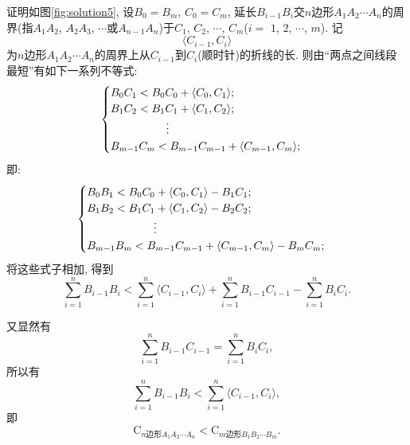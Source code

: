 \documentclass{article}
\begin{document}
{\heiti 证明}\quad 如图\ref{fig:solution5}, 设$B_0=B_m$, $C_0=C_m$, 延长$B_{i-1}B_i$交$n\text{边形}A_1A_2\cdots A_n$的周界(指$A_1A_2$, $A_2A_3$, $\cdots$或$A_{n-1}A_n$)于$C_1$, $C_2$, $\cdots$, $C_m$($i=$ $1$, $2$, $\cdots$, $m$). 记
\[\langle C_{i-1}, C_i\rangle\]
为$n\text{边形}A_1A_2\cdots A_n$的周界上从$C_{i-1}$到$C_i$(顺时针)的折线的长. 则由“两点之间线段最短”有如下一系列不等式:
\[\begin{cases}
	B_0C_1<B_0C_0+\langle C_0, C_1\rangle;\\
	B_1C_2<B_1C_1+\langle C_1, C_2\rangle;\\
	\hspace*{5em}\vdots\\
	B_{m-1}C_m<B_{m-1}C_{m-1}+\langle C_{m-1}, C_m\rangle;\\
\end{cases}\]
即:
\[\begin{cases}
	B_0B_1<B_0C_0+\langle C_0, C_1\rangle-B_1C_1;\\
	B_1B_2<B_1C_1+\langle C_1, C_2\rangle-B_2C_2;\\
	\hspace*{6em}\vdots\\
	B_{m-1}B_m<B_{m-1}C_{m-1}+\langle C_{m-1}, C_m\rangle-B_mC_m;\\
\end{cases}\]
将这些式子相加, 得到
\[\sum\limits_{i=1}^nB_{i-1}B_i<\sum\limits_{i=1}^n\langle C_{i-1}, C_i\rangle+\sum\limits_{i=1}^nB_{i-1}C_{i-1}-\sum\limits_{i=1}^nB_iC_i.\]\par
又显然有
\[\sum\limits_{i=1}^nB_{i-1}C_{i-1}=\sum\limits_{i=1}^nB_iC_i,\]
所以有
\[\sum\limits_{i=1}^nB_{i-1}B_i<\sum\limits_{i=1}^n\langle C_{i-1}, C_i\rangle,\]
即
\[\mathrm{C}_{n\text{边形}A_1A_2\cdots A_n}<\mathrm{C}_{m\text{边形}B_1B_2\cdots B_m}.\]
\rightline{$\square$}


\end{document}
